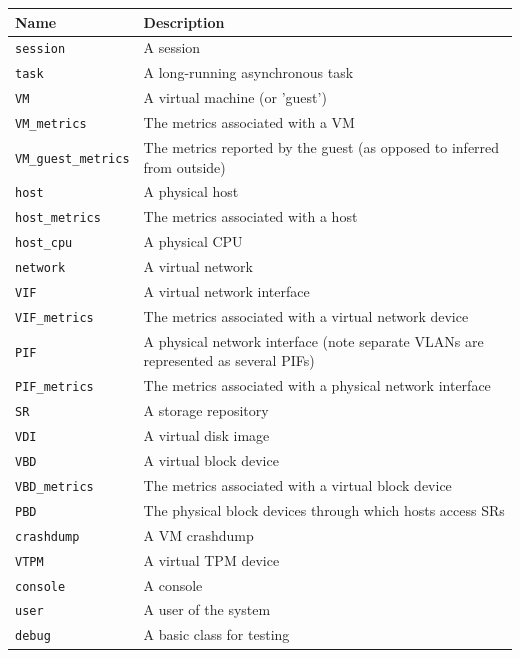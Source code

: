 \begin{center}\begin{tabular}{|lp{10cm}|}
\hline
Name & Description \\
\hline
{\tt session} & A session \\
{\tt task} & A long-running asynchronous task \\
{\tt VM} & A virtual machine (or 'guest') \\
{\tt VM\_metrics} & The metrics associated with a VM \\
{\tt VM\_guest\_metrics} & The metrics reported by the guest (as opposed to inferred from outside) \\
{\tt host} & A physical host \\
{\tt host\_metrics} & The metrics associated with a host \\
{\tt host\_cpu} & A physical CPU \\
{\tt network} & A virtual network \\
{\tt VIF} & A virtual network interface \\
{\tt VIF\_metrics} & The metrics associated with a virtual network device \\
{\tt PIF} & A physical network interface (note separate VLANs are represented as several PIFs) \\
{\tt PIF\_metrics} & The metrics associated with a physical network interface \\
{\tt SR} & A storage repository \\
{\tt VDI} & A virtual disk image \\
{\tt VBD} & A virtual block device \\
{\tt VBD\_metrics} & The metrics associated with a virtual block device \\
{\tt PBD} & The physical block devices through which hosts access SRs \\
{\tt crashdump} & A VM crashdump \\
{\tt VTPM} & A virtual TPM device \\
{\tt console} & A console \\
{\tt user} & A user of the system \\
{\tt debug} & A basic class for testing \\
\hline
\end{tabular}\end{center}
